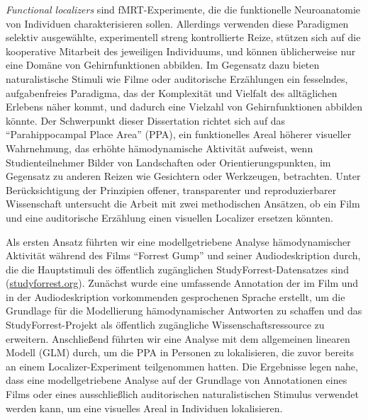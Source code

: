\textit{Functional localizers} sind fMRT-Experimente, die die funktionelle
Neuroanatomie von Individuen charakterisieren sollen.
Allerdings verwenden diese Paradigmen selektiv ausgewählte, experimentell
streng kontrollierte Reize, stützen sich auf die kooperative Mitarbeit des
jeweiligen Individuums, und können üblicherweise nur eine Domäne von
Gehirnfunktionen abbilden.
%
Im Gegensatz dazu bieten naturalistische Stimuli wie Filme oder auditorische
Erzählungen ein fesselndes, aufgabenfreies Paradigma, das der Komplexität und
Vielfalt des alltäglichen Erlebens näher kommt, und dadurch eine Vielzahl von
Gehirnfunktionen abbilden könnte.
Der Schwerpunkt dieser Dissertation richtet sich auf das ``Parahippocampal
Place Area'' (PPA), ein funktionelles Areal höherer visueller Wahrnehmung, das
erhöhte hämodynamische Aktivität aufweist, wenn Studienteilnehmer Bilder von
Landschaften oder Orientierungspunkten, im Gegensatz zu anderen Reizen wie
Gesichtern oder Werkzeugen, betrachten.
%
Unter Berücksichtigung der Prinzipien offener, transparenter und
reproduzierbarer Wissenschaft untersucht die Arbeit mit zwei methodischen
Ansätzen, ob ein Film und eine auditorische Erzählung einen visuellen Localizer
ersetzen könnten.

Als ersten Ansatz führten wir eine modellgetriebene Analyse hämodynamischer
Aktivität während des Films ``Forrest Gump'' und seiner Audiodeskription durch,
die die Hauptstimuli des öffentlich zugänglichen StudyForrest-Datensatzes sind
(\href{www.studyforrest.org}{\url{studyforrest.org}}).
%
Zunächst wurde eine umfassende Annotation der im Film und in der
Audiodeskription vorkommenden gesprochenen Sprache erstellt, um die Grundlage
für die Modellierung hämodynamischer Antworten zu schaffen und das
StudyForrest-Projekt als öffentlich zugängliche Wissenschaftsressource zu
erweitern.
%
Anschließend führten wir eine Analyse mit dem allgemeinen
linearen Modell (GLM) durch, um die PPA in Personen zu lokalisieren, die zuvor
bereits an einem Localizer-Experiment teilgenommen hatten.
Die Ergebnisse legen nahe, dass eine modellgetriebene Analyse auf der Grundlage
von Annotationen eines Films oder eines ausschließlich auditorischen
naturalistischen Stimulus verwendet werden kann, um eine visuelles Areal in
Individuen lokalisieren.


